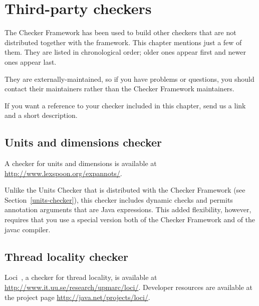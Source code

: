 \htmlhr
\chapter{Third-party checkers\label{third-party-checkers}\label{external-checkers}}

The Checker Framework has been used to build other checkers that are not
distributed together with the framework.  This chapter mentions just a few
of them.  They are listed in chronological order; older ones appear first
and newer ones appear last.

They are externally-maintained, so if you have problems or questions, you
should contact their maintainers rather than the Checker Framework
maintainers.

If you want a reference to your checker included in this chapter,
send us a link and a short description.







\section{Units and dimensions checker\label{units-and-dimensions-checker}}

A checker for units and dimensions is available at
\url{http://www.lexspoon.org/expannots/}.

Unlike the Units Checker that is distributed with the Checker Framework
(see Section~\ref{units-checker}), this checker includes dynamic checks and
permits annotation arguments that are Java expressions.  This added
flexibility, however, requires that you use a special version both of the
Checker Framework and of the javac compiler.


\section{Thread locality checker\label{loci-thread-locality-checker}}

Loci~\cite{WrigstadPMZV2009}, a checker for thread locality, is available at
\url{http://www.it.uu.se/research/upmarc/loci/}.
Developer resources are available at the project page
\url{http://java.net/projects/loci/}.



